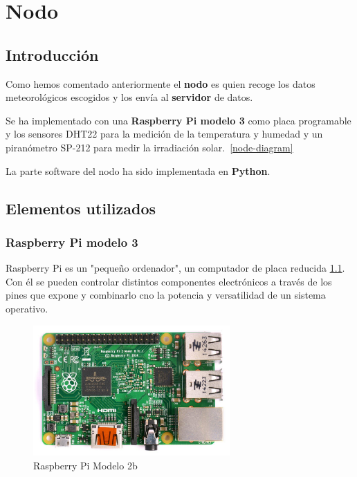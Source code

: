 \cleardoublepage

\chapter{Nodo}
\label{makereference4}

\section{Introducción}
\label{makereference4.1}
Como hemos comentado anteriormente el \textbf{nodo} es quien recoge los datos meteorológicos escogidos y los envía al \textbf{servidor} de datos.

Se ha implementado con una \textbf{Raspberry Pi modelo 3} como placa programable y los sensores DHT22 para la medición de la temperatura y humedad y un piranómetro SP-212 para medir la irradiación solar.~\ref{node-diagram}

La parte software del nodo ha sido implementada en \textbf{Python}.

\section{Elementos utilizados}
\label{makereference4.2}

\subsection*{Raspberry Pi modelo 3}

Raspberry Pi  es un "pequeño ordenador", un computador de placa reducida \ref{rasp}. Con él se pueden controlar distintos componentes electrónicos a través de los pines que expone y combinarlo cno la potencia y versatilidad de un sistema operativo.

\begin{figure}[htb]
	\begin{center}
		\includegraphics[height=5cm]{figures/Raspberry_Pi.jpg}
		\caption{Raspberry Pi Modelo 2b}
	\end{center}
	
	\label{rasp}
\end{figure}

